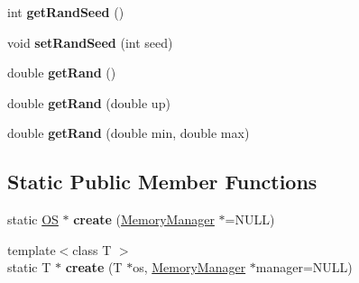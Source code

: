 \begin{DoxyCompactItemize}
\item 
int {\bfseries get\+Rand\+Seed} ()\hypertarget{class_object_script_1_1_o_s_ad004d680cbad852d0f4adc85746dec76}{}\label{class_object_script_1_1_o_s_ad004d680cbad852d0f4adc85746dec76}

\item 
void {\bfseries set\+Rand\+Seed} (int seed)\hypertarget{class_object_script_1_1_o_s_a2ad36f63cbfd9a4d7236b923f5419722}{}\label{class_object_script_1_1_o_s_a2ad36f63cbfd9a4d7236b923f5419722}

\item 
double {\bfseries get\+Rand} ()\hypertarget{class_object_script_1_1_o_s_a0da084363d6f37ee4111fc486997e4f6}{}\label{class_object_script_1_1_o_s_a0da084363d6f37ee4111fc486997e4f6}

\item 
double {\bfseries get\+Rand} (double up)\hypertarget{class_object_script_1_1_o_s_a07ed2952eb5bff8999b70f58eae0ccab}{}\label{class_object_script_1_1_o_s_a07ed2952eb5bff8999b70f58eae0ccab}

\item 
double {\bfseries get\+Rand} (double min, double max)\hypertarget{class_object_script_1_1_o_s_a41e8448e483cdcf315d649041517709e}{}\label{class_object_script_1_1_o_s_a41e8448e483cdcf315d649041517709e}

\end{DoxyCompactItemize}
\subsection*{Static Public Member Functions}
\begin{DoxyCompactItemize}
\item 
static \hyperlink{class_object_script_1_1_o_s}{OS} $\ast$ {\bfseries create} (\hyperlink{class_object_script_1_1_o_s_1_1_memory_manager}{Memory\+Manager} $\ast$=N\+U\+LL)\hypertarget{class_object_script_1_1_o_s_a5472f18cd586e7b17602fcb2bda4bb85}{}\label{class_object_script_1_1_o_s_a5472f18cd586e7b17602fcb2bda4bb85}

\item 
{\footnotesize template$<$class T $>$ }\\static T $\ast$ {\bfseries create} (T $\ast$os, \hyperlink{class_object_script_1_1_o_s_1_1_memory_manager}{Memory\+Manager} $\ast$manager=N\+U\+LL)\hypertarget{class_object_script_1_1_o_s_abc3ebd16b86e0cc7976cbe220535997d}{}\label{class_object_script_1_1_o_s_abc3ebd16b86e0cc7976cbe220535997d}

\end{DoxyCompactItemize}
